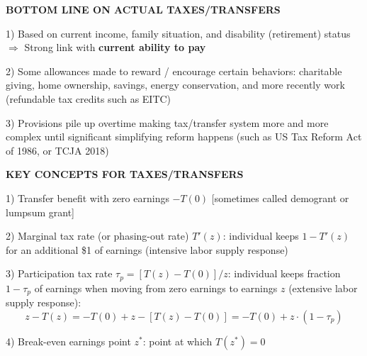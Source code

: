 \documentclass[landscape]{slides}
\begin{document}
\begin{slide}

\end{slide}

\begin{slide}
\begin{center}
{\bf BOTTOM LINE ON ACTUAL TAXES/TRANSFERS}
\end{center}
1) Based on current income, family situation, and disability
(retirement) status $\Rightarrow$ Strong link with {\bf current
ability to pay}

2) Some allowances made to reward / encourage certain behaviors:
charitable giving, home ownership, savings, energy conservation,
and more recently work (refundable tax credits such as EITC)

3) Provisions pile up overtime making tax/transfer system more and
more complex until significant simplifying reform happens (such as
US Tax Reform Act of 1986, or TCJA 2018)

\end{slide}



\begin{slide}
\begin{center}
{\bf KEY CONCEPTS FOR TAXES/TRANSFERS}
\end{center}
1) Transfer benefit with zero earnings $-T(0)$ [sometimes called
demogrant or lumpsum grant]

2) Marginal tax rate (or phasing-out rate) $T'(z)$: individual
keeps $1-T'(z)$ for an additional \$1 of earnings (intensive labor
supply response)

3) Participation tax rate $\tau_p=[T(z)-T(0)]/z$: individual keeps
fraction $1-\tau_p$ of earnings when moving from zero earnings to
earnings $z$ (extensive labor supply response): \[z-T(z)=-T(0)+z - [T(z)-T(0)] = -T(0) + z \cdot
(1-\tau_p)\] 

4) Break-even earnings point $z^*$: point at which $T(z^*)=0$
\end{slide}



\begin{slide}

\end{slide}

\begin{slide}

\end{slide}
\end{document}
